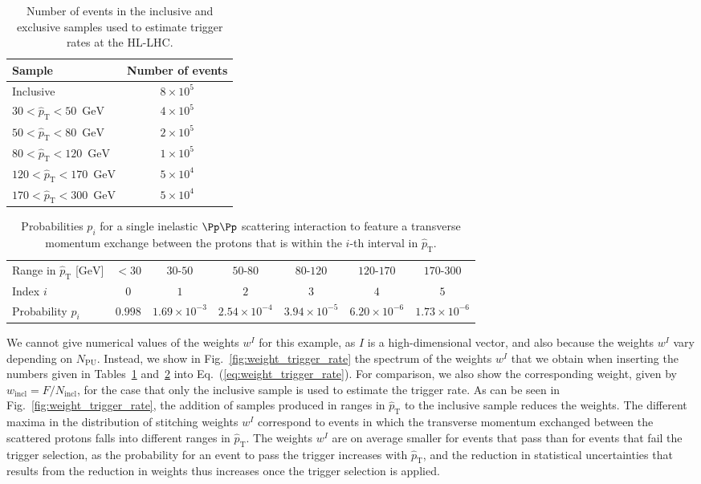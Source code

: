 \documentclass[twocolumn,epjc3]{svjour3}
\newcommand{\pThat}{\ensuremath{\hat{p}_{\textrm{T}}}\xspace}
\newcommand{\GeV}{\ensuremath{\textrm{GeV}}\xspace}
\newcommand{\incl}{\ensuremath{\textrm{incl}}\xspace}
\newcommand{\pileup}{\ensuremath{\textrm{PU}}\xspace}
\begin{document}
\begin{table}
\caption{
  Number of events in the inclusive and exclusive samples used to estimate trigger rates at the HL-LHC.
}
\label{tab:samples_trigger_rate}
\begin{tabular}{l|c}
\hline
Sample                    & Number of events \\
\hline
\hline
Inclusive                 & $8 \times 10^{5}$ \\
\hline
$ 30 < \pThat <  50$~\GeV & $4 \times 10^{5}$ \\
$ 50 < \pThat <  80$~\GeV & $2 \times 10^{5}$ \\
$ 80 < \pThat < 120$~\GeV & $1 \times 10^{5}$ \\
$120 < \pThat < 170$~\GeV & $5 \times 10^{4}$ \\
$170 < \pThat < 300$~\GeV & $5 \times 10^{4}$ \\
\hline
\end{tabular}
\end{table}

\begin{table}
\caption{
  Probabilities $p_{i}$ for a single inelastic $\Pp\Pp$ scattering interaction to feature a transverse momentum exchange 
  between the protons that is within the $i$-th interval in $\pThat$.
}
\label{tab:p_trigger_rate}
\small
\begin{tabular}{l|cccccc}
\hline
Range in $\pThat$ [\GeV] & $< 30$ & $30$-$50$ & $50$-$80$ & $80$-$120$ & $120$-$170$ & $170$-$300$ \\
Index $i$           & $0$ & $1$ & $2$ & $3$ & $4$ & $5$ \\
\hline
\hline
Probability $p_{i}$ & $0.998$ & $1.69 \times 10^{-3}$ & $2.54 \times 10^{-4}$ & $3.94 \times 10^{-5}$ & $6.20 \times 10^{-6}$ & $1.73 \times 10^{-6}$ \\
\hline
\end{tabular}
\end{table}

We cannot give numerical values of the weights $w^{I}$ for this example,
as $I$ is a high-dimensional vector, and also because the weights $w^{I}$ vary depending on $N_{\pileup}$.
Instead, we show in Fig.~\ref{fig:weight_trigger_rate} the spectrum of the weights $w^{I}$
that we obtain when inserting the numbers given in Tables~\ref{tab:samples_trigger_rate} and~\ref{tab:p_trigger_rate} into Eq.~(\ref{eq:weight_trigger_rate}).
For comparison, we also show the corresponding weight, given by $w_{\incl} = F/N_{\incl}$,
for the case that only the inclusive sample is used to estimate the trigger rate.
As can be seen in Fig.~\ref{fig:weight_trigger_rate}, the addition of samples produced in ranges in $\pThat$ to the inclusive sample reduces the weights.
The different maxima in the distribution of stitching weights $w^{I}$ correspond to events 
in which the transverse momentum exchanged between the scattered protons falls into different ranges in $\pThat$.
The weights $w^{I}$ are on average smaller for events that pass than for events that fail the trigger selection,
as the probability for an event to pass the trigger increases with $\pThat$,
and the reduction in statistical uncertainties that results from the reduction in weights thus increases once the trigger selection is applied.
\end{document}
